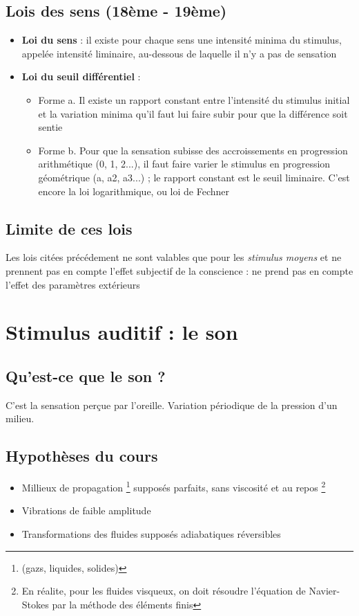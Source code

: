 \subsection{Lois des sens (18ème - 19ème)}
\begin{itemize}
    \item \textbf{Loi du sens} : il existe pour chaque sens une intensité minima du stimulus, appelée intensité liminaire, au-dessous de laquelle il n'y a pas de sensation
    \item \textbf{Loi du seuil différentiel} : 
        \begin{itemize}
            \item Forme a. \newline
            Il existe un rapport constant entre l'intensité du stimulus initial et la variation minima qu'il faut lui faire subir pour que la différence soit sentie
            \newpage
            \item Forme b. \newline
            Pour que la sensation subisse des accroissements en progression arithmétique (0, 1, 2...), il faut faire varier le stimulus en progression géométrique (a, a2, a3...) ; le rapport constant est le seuil liminaire. C'est encore la loi logarithmique, ou loi de Fechner
        \end{itemize}
\end{itemize}
\subsection{Limite de ces lois}
Les lois citées précédement ne sont valables que pour les \textit{stimulus moyens} et ne prennent pas en compte l'effet subjectif de la conscience : ne prend pas en compte l'effet des paramètres extérieurs
\newpage
\section{Stimulus auditif : le son}
\subsection{Qu'est-ce que le son ?}
C'est la sensation perçue par l'oreille. Variation périodique de la pression d'un milieu.
\subsection{Hypothèses du cours}
\begin{itemize}
    \item Millieux de propagation \footnote{(gazs, liquides, solides)} supposés parfaits, sans viscosité et au repos \footnote{En réalite, pour les fluides visqueux, on doit résoudre l'équation de Navier-Stokes par la méthode des éléments finis}
    \item Vibrations de faible amplitude
    \item Transformations des fluides supposés adiabatiques réversibles
\end{itemize}
